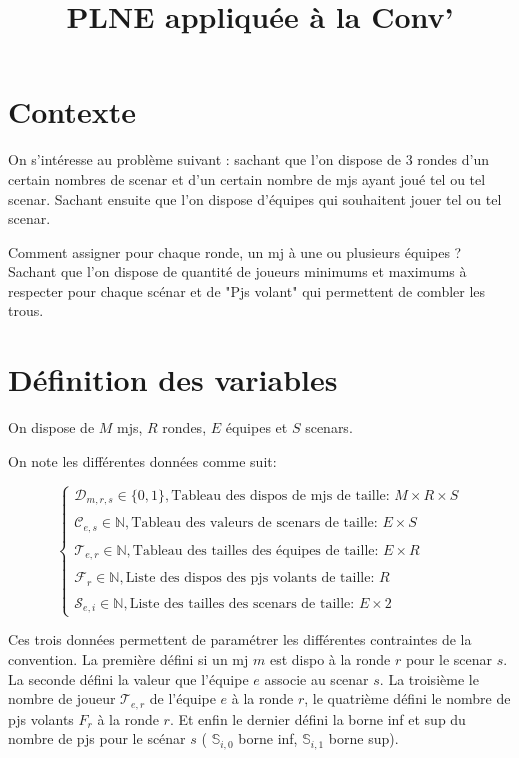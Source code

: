 \documentclass[11pt,a4paper]{article}
\title{PLNE appliquée à la Conv'}
\begin{document}
\maketitle
\section{Contexte}
On s'intéresse au problème suivant : sachant que l'on dispose de 3 rondes d'un certain nombres de scenar et d'un certain nombre de mjs ayant joué tel ou tel scenar. Sachant ensuite que l'on dispose d'équipes qui souhaitent jouer tel ou tel scenar.

Comment assigner pour chaque ronde, un mj à une ou plusieurs équipes ? Sachant que l'on dispose de quantité de joueurs minimums et maximums à respecter pour chaque scénar et de "Pjs volant" qui permettent de combler les trous.

\section{Définition des variables}

On dispose de $M$ mjs, $R$ rondes, $E$ équipes et $S$ scenars.

On note les différentes données comme suit:

\begin{equation}
	\begin{cases}
	\mathcal{D}_{m,r,s} \in \{0,1\}, \text{Tableau des dispos de mjs de taille: } M \times R \times S
	\\ \\
	\mathcal{C}_{e,s} \in \mathbb{N}, \text{Tableau des valeurs de scenars de taille: } E \times S
	\\ \\
	\mathcal{T}_{e,r} \in \mathbb{N}, \text{Tableau des tailles des équipes de taille: } E \times R
	\\ \\
	\mathcal{F}_{r} \in \mathbb{N}, \text{Liste des dispos des pjs volants de taille: } R
	\\ \\
	\mathcal{S}_{e,i} \in \mathbb{N}, \text{Liste des tailles des scenars de taille: } E \times 2
	\end{cases}
\end{equation}

Ces trois données permettent de paramétrer les différentes contraintes de la convention. La première défini si un mj $m$ est dispo à la ronde $r$ pour le scenar $s$. La seconde défini la valeur que l'équipe $e$ associe au scenar $s$. La troisième le nombre de joueur $\mathcal{T}_{e,r}$ de l'équipe $e$ à la ronde $r$, le quatrième défini le nombre de pjs volants $F_{r}$ à la ronde $r$. Et enfin le dernier défini la borne inf et sup du nombre de pjs pour le  scénar $s$ ( $\mathbb{S}_{i,0}$ borne inf, $\mathbb{S}_{i,1}$ borne sup). 
\end{document}
